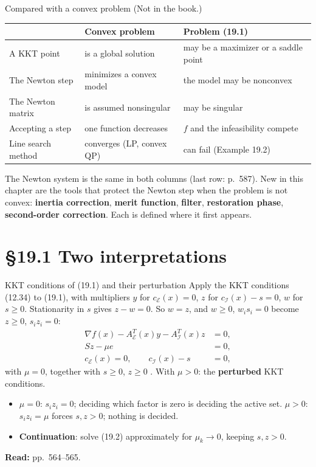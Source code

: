 \documentclass[aspectratio=169,12pt]{beamer}
\newcommand{\eqn}[1]{\text{\small(#1)}}
\newcommand{\readbook}[1]{{\color{red}\textbf{Read:} #1}}
\newcommand{\cE}{\mathcal{E}}
\newcommand{\cI}{\mathcal{I}}
\newcommand{\Ae}{A_{\cE}}
\newcommand{\Ai}{A_{\cI}}
\begin{document}
\begin{frame}{Compared with a convex problem {\normalfont\small(Not in the book.)}}
  \begin{center}\small\setlength\tabcolsep{4pt}
  \renewcommand{\arraystretch}{1.3}
  \begin{tabular}{lll}
    \toprule
     & Convex problem & Problem (19.1) \\
    \midrule
    A KKT point & is a global solution & may be a maximizer or a saddle point \\
    The Newton step & minimizes a convex model & the model may be nonconvex \\
    The Newton matrix & is assumed nonsingular & may be singular \\
    Accepting a step & one function decreases & $f$ and the infeasibility compete \\
    Line search method & converges (LP, convex QP) & can fail (Example 19.2) \\
    \bottomrule
  \end{tabular}
  \end{center}
  \vspace{0.3em}
  The Newton system is the same in both columns (last row: p.~587). New in this chapter are the tools that
  protect the Newton step when the problem is not convex: \textbf{inertia correction},
  \textbf{merit function}, \textbf{filter}, \textbf{restoration phase}, \textbf{second-order correction}.
  Each is defined where it first appears.
\end{frame}

\section{\S19.1 Two interpretations}

\begin{frame}{KKT conditions of (19.1) and their perturbation}
  Apply the KKT conditions (12.34) to (19.1), with multipliers $y$ for $c_{\cE}(x)=0$, $z$ for
  $c_{\cI}(x)-s=0$, $w$ for $s\ge 0$. Stationarity in $s$ gives $z-w=0$. So $w=z$, and
  $w\ge 0$, $w_{i}s_{i}=0$ become $z\ge 0$, $s_{i}z_{i}=0$:
  \begin{align}
    \nabla f(x)-\Ae^{T}(x)y-\Ai^{T}(x)z&=0, \tag{19.2a}\\
    Sz-\mu e&=0, \tag{19.2b}\\
    c_{\cE}(x)=0,\qquad c_{\cI}(x)-s&=0, \tag{19.2c--d}
  \end{align}
  with $\mu=0$, together with $s\ge 0$, $z\ge 0$ \eqn{19.3}. With $\mu>0$: the \textbf{perturbed} KKT conditions.
  \begin{itemize}\setlength\itemsep{0.25em}
    \item $\mu=0$: $s_{i}z_{i}=0$; deciding which factor is zero is deciding the active set.
      $\mu>0$: $s_{i}z_{i}=\mu$ forces $s,z>0$; nothing is decided.
    \item \textbf{Continuation}: solve (19.2) approximately for $\mu_{k}\to 0$, keeping $s,z>0$.
  \end{itemize}
  \readbook{pp.~564--565.}
\end{frame}
\end{document}
